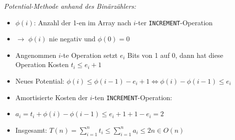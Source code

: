 \documentclass[
    ngerman,
    color=3b,
    load_common, %
    summary,
    boxarc,
]{rubos-tuda-template}
\begin{document}
\textit{Potential-Methode anhand des Binärzählers:}
\begin{itemize}
    \item $\phi(i)$: Anzahl der 1-en im Array nach $i$-ter \texttt{INCREMENT}-Operation
    \item[] $\rightarrow$ $\phi(i)$ nie negativ und $\phi(0) = 0$
    \item Angenommen $i$-te Operation setzt $e_i$ Bits von 1 auf 0, dann hat diese Operation Kosten $t_i \leq e_i + 1$
    \item Neues Potential: $\phi(i) \leq \phi(i-1) - e_i + 1 \Leftrightarrow \phi(i) - \phi(i-1) \leq e_i$
    \item Amortisierte Kosten der $i$-ten \texttt{INCREMENT}-Operation:
    \item[] $a_i = t_i + \phi(i) - \phi(i-1) \leq e_i + 1 + 1 - e_i = 2$
    \item Insgesamt: $T(n) = \sum^n_{i=1} t_i \leq \sum^n_{i=1} a_i \leq 2n \in O(n)$
\end{itemize}

\clearpage
\end{document}
